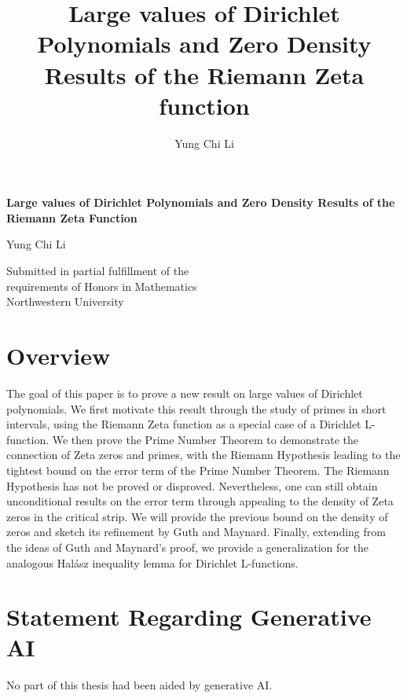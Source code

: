 \documentclass[openany,
ngerman,
toc=flat,
toc=chapterentrywithdots,
captions=tableabove,
listof=entryprefix,
listof=leveldown,
fontsize=12pt,
numbers=noenddot]
{book}
\title{Large values of Dirichlet Polynomials and Zero Density Results of the Riemann Zeta function}
\author{Yung Chi Li}
\date{}
\begin{document}
\begin{titlepage}
    \begin{center}
        \vspace*{1cm}
            
        \Large
        \textbf{Large values of Dirichlet Polynomials and Zero Density Results of the Riemann Zeta Function}
            
        \vspace{0.5cm}
        
        \Large
        Yung Chi Li
            
        \vfill
            
       	Submitted in partial fulfillment of the\\ requirements of
		Honors in Mathematics\\
		
		
		Northwestern University
            
    
            
    \end{center}
\end{titlepage}

\section*{Overview}
	The goal of this paper is to prove a new result on large values of Dirichlet polynomials.
	We first motivate this result through the study of primes in short intervals, using the Riemann Zeta function as a special case of a Dirichlet L-function. We then prove the Prime Number Theorem to demonstrate the connection of Zeta zeros and primes, with the Riemann Hypothesis leading to the tightest bound on the error term of the Prime Number Theorem. 
	The Riemann Hypothesis has not be proved or disproved. Nevertheless, one can still obtain unconditional results on the error term through appealing to the density of Zeta zeros in the critical strip. We will provide the previous bound on the density of zeros and sketch its refinement by Guth and Maynard. Finally, extending from the ideas of Guth and Maynard's proof, we provide a generalization for the analogous Hal\'asz inequality lemma for Dirichlet L-functions.


{\let\clearpage\relax \tableofcontents}
\section*{Statement Regarding Generative AI}
No part of this thesis had been aided by generative AI.
\end{document}
